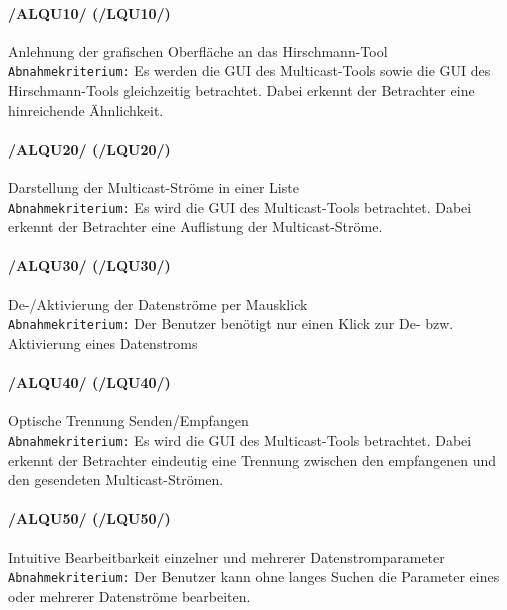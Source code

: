 \paragraph{/ALQU10/ (/LQU10/)} Anlehnung der grafischen Oberfläche an das
Hirschmann-Tool\\ %
\texttt{Abnahmekriterium:} Es werden die GUI des Multicast-Tools
sowie die GUI des Hirschmann-Tools gleichzeitig betrachtet. Dabei
erkennt der Betrachter eine hinreichende Ähnlichkeit.\\

\paragraph{/ALQU20/ (/LQU20/)} Darstellung der Multicast-Ströme in einer Liste\\
\texttt{Abnahmekriterium:} Es wird die GUI des Multicast-Tools
betrachtet. Dabei erkennt der  Betrachter eine Auflistung der
Multicast-Ströme.\\

\paragraph{/ALQU30/ (/LQU30/)} De-/Aktivierung der Datenströme per Mausklick\\
\texttt{Abnahmekriterium:} Der Benutzer benötigt nur einen Klick
zur De- bzw. Aktivierung eines Datenstroms\\

\paragraph{/ALQU40/ (/LQU40/)} Optische Trennung Senden/Empfangen\\
\texttt{Abnahmekriterium:} Es wird die GUI des Multicast-Tools
betrachtet. Dabei erkennt der Betrachter eindeutig eine Trennung
zwischen den empfangenen und den gesendeten Multicast-Strömen.\\

\paragraph{/ALQU50/ (/LQU50/)} Intuitive Bearbeitbarkeit einzelner und mehrerer
Datenstromparameter\\
\texttt{Abnahmekriterium:} Der Benutzer kann ohne langes Suchen
die Parameter eines oder mehrerer Datenströme bearbeiten.\\


